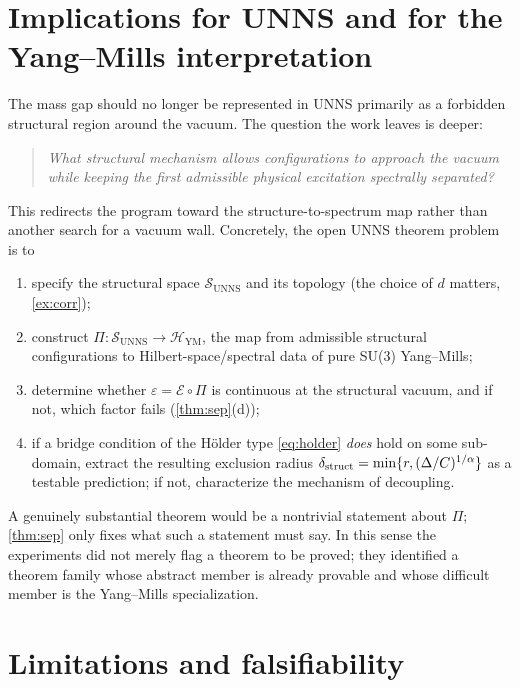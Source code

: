 \documentclass[11pt,a4paper]{article}
\theoremstyle{definition}
\theoremstyle{remark}
\newcommand{\SUNNS}{\mathcal{S}_{\mathrm{UNNS}}}
\newcommand{\HYM}{\mathcal{H}_{\mathrm{YM}}}
\newcommand{\uns}{UNNS}
\begin{document}
\section{Implications for UNNS and for the Yang--Mills interpretation}\label{sec:implications}

The mass gap should no longer be represented in \uns{} primarily as a forbidden structural region around the vacuum. The question the work leaves is deeper:
\begin{quote}
\emph{What structural mechanism allows configurations to approach the vacuum while keeping the first admissible physical excitation spectrally separated?}
\end{quote}
This redirects the program toward the structure-to-spectrum map rather than another search for a vacuum wall. Concretely, the open \uns{} theorem problem is to
\begin{enumerate}[label=(\roman*)]
\item specify the structural space $\SUNNS$ and its topology (the choice of $d$ matters, \cref{ex:corr});
\item construct $\Pi:\SUNNS\to\HYM$, the map from admissible structural configurations to Hilbert-space/spectral data of pure SU(3) Yang--Mills;
\item determine whether $\varepsilon=\mathcal E\circ\Pi$ is continuous at the structural vacuum, and if not, which factor fails (\cref{thm:sep}(d));
\item if a bridge condition of the Hölder type \eqref{eq:holder} \emph{does} hold on some sub-domain, extract the resulting exclusion radius $\delta_{\rm struct}=\min\{r,(\Delta/C)^{1/\alpha}\}$ as a testable prediction; if not, characterize the mechanism of decoupling.
\end{enumerate}
A genuinely substantial theorem would be a nontrivial statement about $\Pi$; \cref{thm:sep} only fixes what such a statement must say. In this sense the experiments did not merely flag a theorem to be proved; they identified a theorem family whose abstract member is already provable and whose difficult member is the Yang--Mills specialization.

\section{Limitations and falsifiability}\label{sec:limits}
\end{document}
